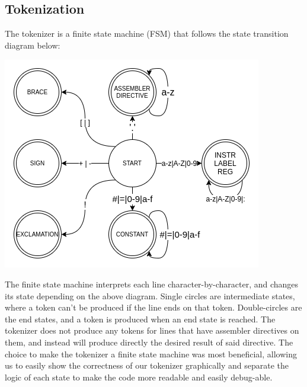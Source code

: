 \documentclass[11pt]{article}
\begin{document}
\subsection*{Tokenization}
The tokenizer is a finite state machine (FSM) that follows the state transition diagram below:
\begin{center}
	\includegraphics[scale=0.6]{fsmDiagram}
\end{center}
The finite state machine interprets each line character-by-character, and changes its state depending on the above diagram. Single circles are intermediate states, where a token can't be produced if the line ends on that token. Double-circles are the end states, and a token is produced when an end state is reached. The tokenizer does not produce any tokens for lines that have assembler directives on them, and instead will produce directly the desired result of said directive.
The choice to make the tokenizer a finite state machine was most beneficial, allowing us to easily show the correctness of our tokenizer graphically and separate the logic of each state to make the code more readable and easily debug-able.  
\end{document}
